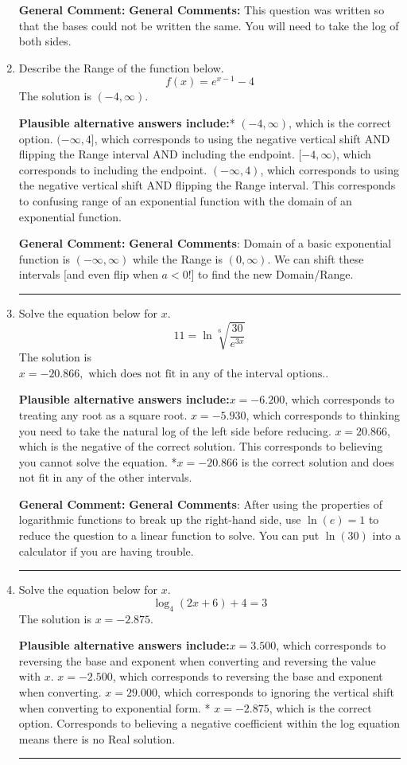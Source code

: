 \documentclass{extbook}[14pt]
\newcommand{\litem}[1]{\item #1

\rule{\textwidth}{0.4pt}}
\begin{document}
\begin{enumerate}
{\textbf{General Comment:} \textbf{General Comments:} This question was written so that the bases could not be written the same. You will need to take the log of both sides.
}
\litem{
Describe the Range of the function below.
\[ f(x) = e^{x-1}-4 \]The solution is \( (-4, \infty) \).\begin{enumerate}[label=\Alph*.]
\textbf{Plausible alternative answers include:}* $(-4, \infty)$, which is the correct option.
$(-\infty, 4]$, which corresponds to using the negative vertical shift AND flipping the Range interval AND including the endpoint.
$[-4, \infty)$, which corresponds to including the endpoint.
$(-\infty, 4)$, which corresponds to using the negative vertical shift AND flipping the Range interval.
This corresponds to confusing range of an exponential function with the domain of an exponential function.
\end{enumerate}

\textbf{General Comment:} \textbf{General Comments}: Domain of a basic exponential function is $(-\infty, \infty)$ while the Range is $(0, \infty)$. We can shift these intervals [and even flip when $a<0$!] to find the new Domain/Range.
}
\litem{
Solve the equation below for $x$.
\[  11 = \ln{\sqrt[6]{\frac{30}{e^{3x}}}} \]The solution is \( x = -20.866, \text{ which does not fit in any of the interval options.} \).\begin{enumerate}[label=\Alph*.]
\textbf{Plausible alternative answers include:}$x = -6.200$, which corresponds to treating any root as a square root.
$x = -5.930$, which corresponds to thinking you need to take the natural log of the left side before reducing.
$x = 20.866$, which is the negative of the correct solution.
This corresponds to believing you cannot solve the equation.
*$x = -20.866$ is the correct solution and does not fit in any of the other intervals.
\end{enumerate}

\textbf{General Comment:} \textbf{General Comments}: After using the properties of logarithmic functions to break up the right-hand side, use $\ln(e) = 1$ to reduce the question to a linear function to solve. You can put $\ln(30)$ into a calculator if you are having trouble.
}
\litem{
Solve the equation below for $x$.
\[ \log_{4}{(2x+6)}+4 = 3 \]The solution is \( x = -2.875 \).\begin{enumerate}[label=\Alph*.]
\textbf{Plausible alternative answers include:}$x = 3.500$, which corresponds to reversing the base and exponent when converting and reversing the value with $x$.
$x = -2.500$, which corresponds to reversing the base and exponent when converting.
$x = 29.000$, which corresponds to ignoring the vertical shift when converting to exponential form.
* $x = -2.875$, which is the correct option.
Corresponds to believing a negative coefficient within the log equation means there is no Real solution.
\end{enumerate}

}
\end{enumerate}
\end{document}
